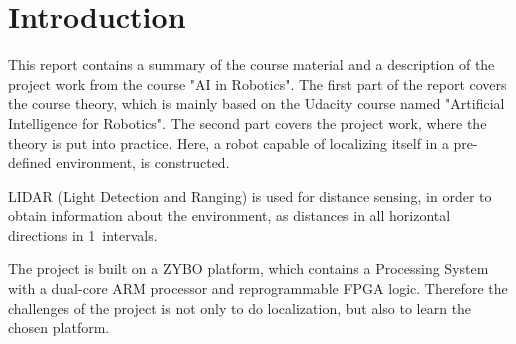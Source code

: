 \documentclass[Main]{subfiles}
\begin{document}
\part*{Introduction} %
\label{cha:introduction}

	This report contains a summary of the course material and a description of the project work from the course "AI in Robotics".
	The first part of the report covers the course theory, which is mainly based on the Udacity course named "Artificial Intelligence for Robotics".
	The second part covers the project work, where the theory is put into practice.
	Here, a robot capable of localizing itself in a pre-defined environment, is constructed.

	LIDAR (Light Detection and Ranging) is used for distance sensing, in order to obtain information about the environment, as distances in all horizontal directions in 1\degree\ intervals.

	The project is built on a ZYBO platform, which contains a Processing System with a dual-core ARM processor and reprogrammable FPGA logic.
	Therefore the challenges of the project is not only to do localization, but also to learn the chosen platform.

\end{document}
